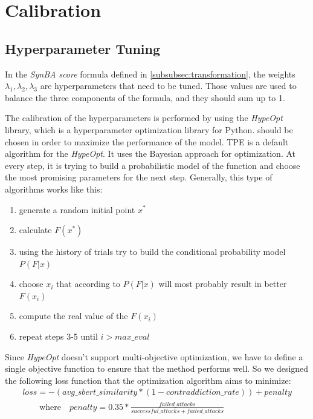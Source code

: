 \section{Calibration}\label{sec:calibration}

\subsection{Hyperparameter Tuning}\label{subsec:hyperparameter-tuning}

In the \emph{SynBA score} formula defined in \ref{subsubsec:transformation}, the weights $\lambda_1, \lambda_2, \lambda_3$ are hyperparameters that need to be tuned. 
Those values are used to balance the three components of the formula, and they should sum up to 1.

The calibration of the hyperparameters is performed by using the \emph{HypeOpt} \cite{conf/icml/BergstraYC13} library, which is a hyperparameter optimization library for Python. 
should be chosen in order to maximize the performance of the model.
TPE \cite{bergstra2011algorithms} is a default algorithm for the \emph{HypeOpt}. It uses the Bayesian approach for optimization. At every step, it is trying to build a probabilistic model of the function and choose the most promising parameters for the next step. Generally, this type of algorithms works like this:
\begin{enumerate}
    \item generate a random initial point  $x^*$ 
    \item calculate  $F(x^*)$
    \item using the history of trials try to build the conditional probability model  $P(F|x)$
    \item choose  $x_i$  that according to  $P(F|x)$  will most probably result in better  $F(x_i)$
    \item compute the real value of the  $F(x_i)$ 
    \item repeat steps 3-5 until $i > max\_eval$
\end{enumerate}

Since \emph{HypeOpt} doesn't support multi-objective optimization, we have to define a single objective function to ensure that the method performs well.
So we designed the following loss function that the optimization algorithm aims to minimize:
\begin{multline}
    loss = - ( avg\_sbert\_similarity * (1 - contraddiction\_rate) ) + penalty \\
    \qquad \text{where} \quad penalty = 0.35 *  \frac{failed\_attacks}{successful\_attacks + failed\_attacks}\\
\end{multline}

